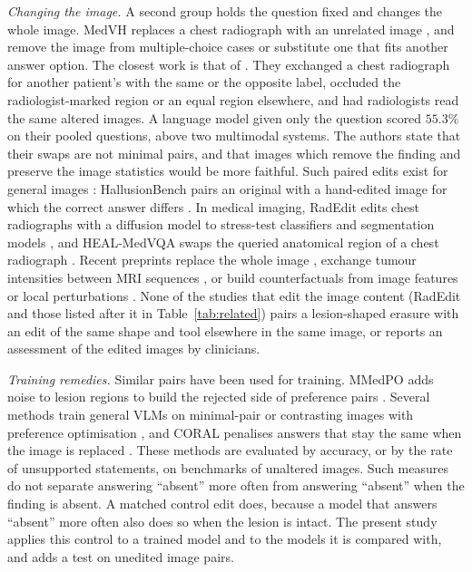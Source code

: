 \textit{Changing the image.} A second group holds the question fixed and changes the whole image. MedVH replaces a chest radiograph with an unrelated image \citep{gu2024medvh}, and \citet{gu2025illusion} remove the image from multiple-choice cases or substitute one that fits another answer option. The closest work is that of \citet{lotfinia2026image}. They exchanged a chest radiograph for another patient's with the same or the opposite label, occluded the radiologist-marked region or an equal region elsewhere, and had radiologists read the same altered images. A language model given only the question scored $55.3\%$ on their pooled questions, above two multimodal systems. The authors state that their swaps are not minimal pairs, and that images which remove the finding and preserve the image statistics would be more faithful. Such paired edits exist for general images \citep{agarwal2020towards}: HallusionBench pairs an original with a hand-edited image for which the correct answer differs \citep{guan2024hallusionbench}. In medical imaging, RadEdit edits chest radiographs with a diffusion model to stress-test classifiers and segmentation models \citep{perez2024radedit}, and HEAL-MedVQA swaps the queried anatomical region of a chest radiograph \citep{healmedvqa2024}. Recent preprints replace the whole image \citep{zafar2026coral}, exchange tumour intensities between MRI sequences \citep{sun2026prive}, or build counterfactuals from image features or local perturbations \citep{huang2026medcap,lin2026medcausalx}. None of the studies that edit the image content (RadEdit and those listed after it in Table~\ref{tab:related}) pairs a lesion-shaped erasure with an edit of the same shape and tool elsewhere in the same image, or reports an assessment of the edited images by clinicians.

\textit{Training remedies.} Similar pairs have been used for training. MMedPO adds noise to lesion regions to build the rejected side of preference pairs \citep{zhu2024mmedpo}. Several methods train general VLMs on minimal-pair or contrasting images with preference optimisation \citep{svco2024,wu2025empo,jiang2025mfpo,rafailov2023dpo}, and CORAL penalises answers that stay the same when the image is replaced \citep{zafar2026coral}. These methods are evaluated by accuracy, or by the rate of unsupported statements, on benchmarks of unaltered images. Such measures do not separate answering ``absent'' more often from answering ``absent'' when the finding is absent. A matched control edit does, because a model that answers ``absent'' more often also does so when the lesion is intact. The present study applies this control to a trained model and to the models it is compared with, and adds a test on unedited image pairs.

